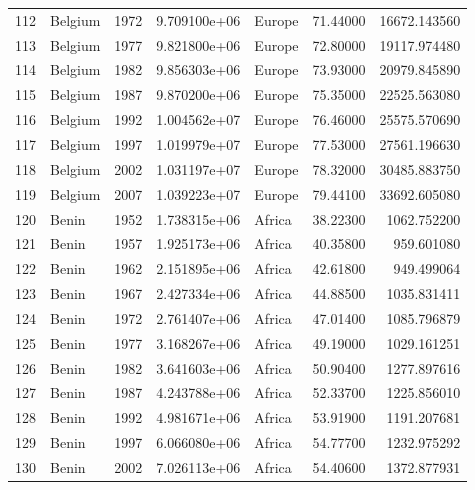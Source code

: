 \documentclass[
  letterpaper,
  DIV=11,
  numbers=noendperiod]{scrreprt}
\begin{document}
\begin{tabular}{llrrlrr}
112  &                   Belgium &  1972 &  9.709100e+06 &    Europe &  71.44000 &   16672.143560 \\
113  &                   Belgium &  1977 &  9.821800e+06 &    Europe &  72.80000 &   19117.974480 \\
114  &                   Belgium &  1982 &  9.856303e+06 &    Europe &  73.93000 &   20979.845890 \\
115  &                   Belgium &  1987 &  9.870200e+06 &    Europe &  75.35000 &   22525.563080 \\
116  &                   Belgium &  1992 &  1.004562e+07 &    Europe &  76.46000 &   25575.570690 \\
117  &                   Belgium &  1997 &  1.019979e+07 &    Europe &  77.53000 &   27561.196630 \\
118  &                   Belgium &  2002 &  1.031197e+07 &    Europe &  78.32000 &   30485.883750 \\
119  &                   Belgium &  2007 &  1.039223e+07 &    Europe &  79.44100 &   33692.605080 \\
120  &                     Benin &  1952 &  1.738315e+06 &    Africa &  38.22300 &    1062.752200 \\
121  &                     Benin &  1957 &  1.925173e+06 &    Africa &  40.35800 &     959.601080 \\
122  &                     Benin &  1962 &  2.151895e+06 &    Africa &  42.61800 &     949.499064 \\
123  &                     Benin &  1967 &  2.427334e+06 &    Africa &  44.88500 &    1035.831411 \\
124  &                     Benin &  1972 &  2.761407e+06 &    Africa &  47.01400 &    1085.796879 \\
125  &                     Benin &  1977 &  3.168267e+06 &    Africa &  49.19000 &    1029.161251 \\
126  &                     Benin &  1982 &  3.641603e+06 &    Africa &  50.90400 &    1277.897616 \\
127  &                     Benin &  1987 &  4.243788e+06 &    Africa &  52.33700 &    1225.856010 \\
128  &                     Benin &  1992 &  4.981671e+06 &    Africa &  53.91900 &    1191.207681 \\
129  &                     Benin &  1997 &  6.066080e+06 &    Africa &  54.77700 &    1232.975292 \\
130  &                     Benin &  2002 &  7.026113e+06 &    Africa &  54.40600 &    1372.877931 \\

\end{tabular}
\end{document}
